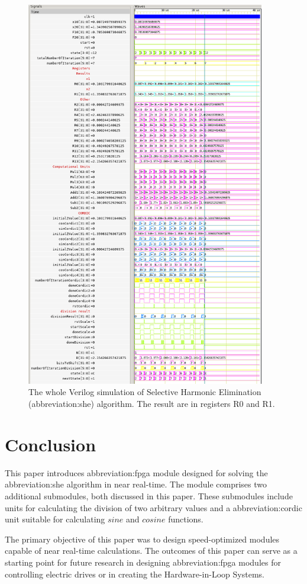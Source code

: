 \documentclass[a4paper, twoside, 11pt]{article}
\begin{document}
            \begin{figure}[htbp!]
                \centering
                \includegraphics[width=0.93\textwidth]{src/png/inverted/she-sim-all.png}
                \caption{The whole Verilog simulation of Selective Harmonic Elimination (\gls{abbreviation:she}) algorithm. The result are in registers R0 and R1.}
                \label{fig:she-sim-all}
            \end{figure}
\newpage
{} 
\section*{Conclusion}
This paper introduces \gls{abbreviation:fpga} module designed for solving the \gls{abbreviation:she} algorithm in near real-time. The module comprises two additional submodules, both discussed in this paper. These submodules include units for calculating the division of two arbitrary values and a \gls{abbreviation:cordic} unit suitable for calculating $sine$ and $cosine$ functions.\par
The primary objective of this paper was to design speed-optimized modules capable of near real-time calculations. The outcomes of this paper can serve as a starting point for future research in designing \gls{abbreviation:fpga} modules for controlling electric drives or in creating the Hardware-in-Loop Systems.
\end{document}
